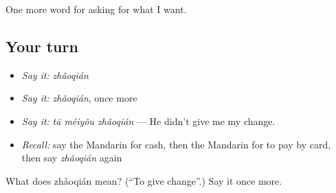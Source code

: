 \begin{grammarlens}[title={What you've built}]
One more word for asking for what I want.
\end{grammarlens}

\subsection*{Your turn}
\begin{itemize}
\raggedright
  \item \emph{Say it:} \emph{zhǎoqián}
  \item \emph{Say it:} \emph{zhǎoqián}, once more
  \item \emph{Say it:} \emph{tā méiyǒu zhǎoqián} — He didn't give me my change.
  \item \emph{Recall:} say the Mandarin for cash, then the Mandarin for to pay by card, then say \emph{zhǎoqián} again
\end{itemize}

\begin{tcolorbox}[breakable,colback=teal!4,colframe=teal!35!black,title={Before you move on}]
What does zhǎoqián mean? (\textquotedblleft{}To give change\textquotedblright{}.) Say it once more.
\end{tcolorbox}
